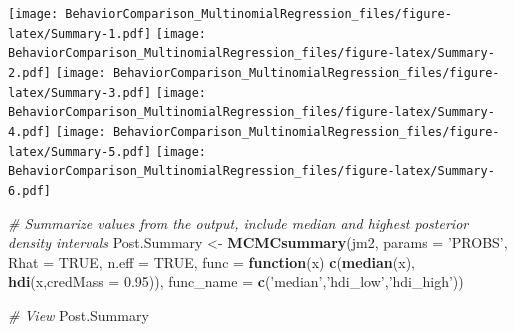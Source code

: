 \documentclass[]{article}
\newenvironment{Shaded}{\begin{snugshade}}{\end{snugshade}}
\newcommand{\CommentTok}[1]{\textcolor[rgb]{0.56,0.35,0.01}{\textit{#1}}}
\newcommand{\ControlFlowTok}[1]{\textcolor[rgb]{0.13,0.29,0.53}{\textbf{#1}}}
\newcommand{\DataTypeTok}[1]{\textcolor[rgb]{0.13,0.29,0.53}{#1}}
\newcommand{\FloatTok}[1]{\textcolor[rgb]{0.00,0.00,0.81}{#1}}
\newcommand{\KeywordTok}[1]{\textcolor[rgb]{0.13,0.29,0.53}{\textbf{#1}}}
\newcommand{\NormalTok}[1]{#1}
\newcommand{\OtherTok}[1]{\textcolor[rgb]{0.56,0.35,0.01}{#1}}
\newcommand{\StringTok}[1]{\textcolor[rgb]{0.31,0.60,0.02}{#1}}
\begin{document}
\texttt{[image: BehaviorComparison\_MultinomialRegression\_files/figure-latex/Summary-1.pdf]}
\texttt{[image: BehaviorComparison\_MultinomialRegression\_files/figure-latex/Summary-2.pdf]}
\texttt{[image: BehaviorComparison\_MultinomialRegression\_files/figure-latex/Summary-3.pdf]}
\texttt{[image: BehaviorComparison\_MultinomialRegression\_files/figure-latex/Summary-4.pdf]}
\texttt{[image: BehaviorComparison\_MultinomialRegression\_files/figure-latex/Summary-5.pdf]}
\texttt{[image: BehaviorComparison\_MultinomialRegression\_files/figure-latex/Summary-6.pdf]}

\begin{Shaded}
\begin{Highlighting}[]
\CommentTok{# Summarize values from the output, include median and highest posterior density intervals}
\NormalTok{Post.Summary <-}\StringTok{ }\KeywordTok{MCMCsummary}\NormalTok{(jm2, }
                            \DataTypeTok{params =} \StringTok{'PROBS'}\NormalTok{,}
                            \DataTypeTok{Rhat =} \OtherTok{TRUE}\NormalTok{,}
                            \DataTypeTok{n.eff =} \OtherTok{TRUE}\NormalTok{,}
                            \DataTypeTok{func =} \ControlFlowTok{function}\NormalTok{(x) }\KeywordTok{c}\NormalTok{(}\KeywordTok{median}\NormalTok{(x), }\KeywordTok{hdi}\NormalTok{(x,}\DataTypeTok{credMass =} \FloatTok{0.95}\NormalTok{)),}
                            \DataTypeTok{func_name =} \KeywordTok{c}\NormalTok{(}\StringTok{'median'}\NormalTok{,}\StringTok{'hdi_low'}\NormalTok{,}\StringTok{'hdi_high'}\NormalTok{))}

\CommentTok{# View}
\NormalTok{Post.Summary}
\end{Highlighting}
\end{Shaded}
\end{document}
